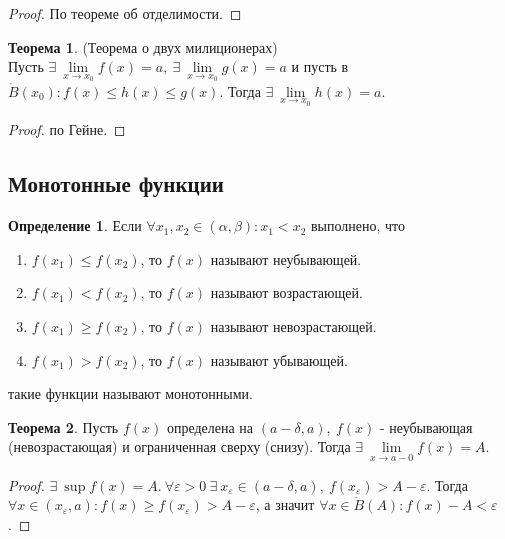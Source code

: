 \documentclass[a4paper, 12pt]{article}
\newcommand{\Bo}{\mathring{B}}
\renewcommand{\epsilon}{\varepsilon}
\theoremstyle{definition}
\newtheorem*{definition}{Определение}
\newtheorem*{theorem}{Теорема}
\begin{document}
        \begin{proof}
            По теореме об отделимости.
        \end{proof} 
        \begin{theorem}(Теорема о двух милиционерах)\\
            Пусть $\exists\ \lim\limits_{x\to x_0}f(x)=a,\ \exists\ \lim\limits_{x\to x_0}g(x)=a$ и пусть в $\Bo(x_0): f(x)\leq h(x)\leq g(x)$. Тогда $\exists\ \lim\limits_{x\to x_0}h(x)=a$.
        \end{theorem} 
        \begin{proof}
            по Гейне.
        \end{proof} 
    \subsection{Монотонные функции}
        \begin{definition}
            Если $\forall x_1, x_2\in (\alpha, \beta): x_1<x_2$ выполнено, что
            \begin{enumerate}
                \item $f(x_1)\leq f(x_2)$, то $f(x)$ называют неубывающей.
                \item $f(x_1)< f(x_2)$, то $f(x)$ называют возрастающей.
                \item $f(x_1)\geq f(x_2)$, то $f(x)$ называют невозрастающей.
                \item $f(x_1)> f(x_2)$, то $f(x)$ называют убывающей.
            \end{enumerate}
            такие функции называют монотонными.
        \end{definition} 
        \begin{theorem}
            Пусть $f(x)$ определена на $(a-\delta, a),\ f(x)$ - неубывающая (невозрастающая) и ограниченная сверху (снизу). Тогда $\exists\ \lim\limits_{x\to a-0}f(x)=A$.
        \end{theorem} 
        \begin{proof}
            $\exists\ \sup{f(x)}=A.\ \forall \epsilon>0\ \exists\ x_{\epsilon}\in (a-\delta, a),\ f(x_{\epsilon})>A-\epsilon$. Тогда $\forall x\in (x_{\epsilon},a): f(x)\geq f(x_{\epsilon})>A-\epsilon$, а значит $\forall x\in \Bo(A): f(x)-A<\epsilon$.
        \end{proof}
\end{document}
